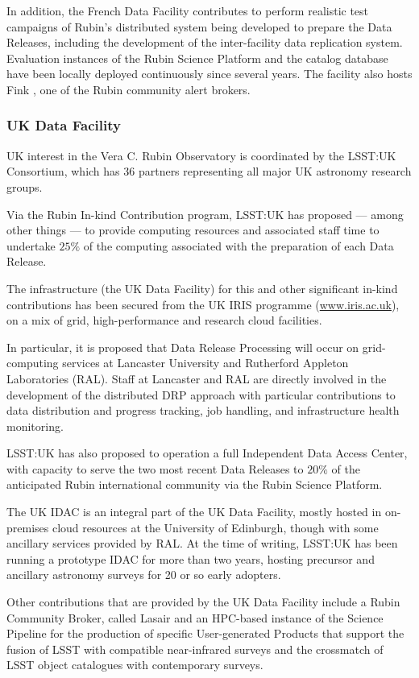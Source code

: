 In addition, the French Data Facility contributes to perform realistic test campaigns of Rubin's distributed system being developed to prepare the Data Releases, including the development of the inter-facility data replication system. Evaluation instances of the Rubin Science Platform and the catalog database have been locally deployed continuously since several years. The facility also hosts Fink \citep{10.1093/mnras/staa3602}, one of the Rubin community alert brokers.

\subsubsection{UK Data Facility} \label{sec:ukdf}

UK interest in the Vera C. Rubin Observatory is coordinated by the LSST:UK Consortium, which has 36 partners representing all major UK astronomy research groups.

Via the Rubin In-kind Contribution program, LSST:UK has proposed --- among other things --- to provide computing resources and associated staff time to undertake $25\%$ of the computing associated with the preparation of each Data Release.

The infrastructure (the UK Data Facility) for this and other significant in-kind contributions has been secured from the UK IRIS programme (\url{www.iris.ac.uk}), on a mix of grid, high-performance and research cloud facilities.

In particular, it is proposed that Data Release Processing will occur on grid-computing services at Lancaster University and Rutherford Appleton Laboratories (RAL). Staff at Lancaster and RAL are directly involved in the development of the distributed DRP approach with particular contributions to data distribution and progress tracking, job handling, and infrastructure health monitoring.

LSST:UK has also proposed to operation a full Independent Data Access Center, with capacity to serve the two most recent Data Releases to $20\%$ of the anticipated Rubin international community via the Rubin Science Platform.

The UK IDAC is an integral part of the UK Data Facility, mostly hosted in on-premises cloud resources at the University of Edinburgh, though with some ancillary services provided by RAL. At the time of writing, LSST:UK has been running a prototype IDAC for more than two years, hosting precursor and ancillary astronomy surveys for 20 or so early adopters.

Other contributions that are provided by the UK Data Facility include a Rubin Community Broker, called Lasair and an HPC-based instance of the Science Pipeline for the production of specific User-generated Products that support the fusion of LSST with compatible near-infrared surveys and the crossmatch of LSST object catalogues with contemporary surveys.
